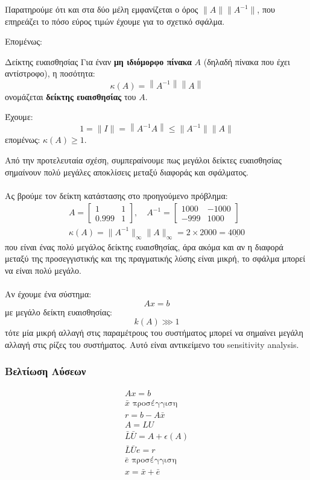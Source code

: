 \documentclass[11pt,a4paper,notitlepage,fleqn,final]{article}
\begin{document}
Παρατηρούμε ότι και στα δύο μέλη εμφανίζεται ο όρος
\( \lVert A\rVert\lVert A^{-1}\rVert \), που επηρεάζει το πόσο
εύρος τιμών έχουμε για το σχετικό σφάλμα.

Επομένως:

\begin{defn}{Δείκτης ευαισθησίας}{}
	Για έναν \textbf{μη ιδιόμορφο πίνακα} \( A \) (δηλαδή πίνακα
	που έχει αντίστροφο), η ποσότητα:
	\[
	\kappa(A) = \left\lVert A^{-1} \right\rVert
	\left\lVert A \right\rVert
	\]
	ονομάζεται \textbf{δείκτης ευαισθησίας} του \( A \).
\end{defn}

Έχουμε:
\[
1 = \lVert I \rVert = \left\lVert A^{-1} A \right\rVert
\leq \lVert A^{-1} \rVert \lVert A\rVert
\]
επομένως: \( \kappa(A) \geq 1 \).

Από την προτελευταία σχέση, συμπεραίνουμε πως μεγάλοι δείκτες
ευαισθησίας σημαίνουν πολύ μεγάλες αποκλίσεις μεταξύ διαφοράς
και σφάλματος.

\paragraph{}
Ας βρούμε τον δείκτη κατάστασης στο προηγούμενο πρόβλημα:
\begin{gather*}
	A = \left[\begin{matrix}
	1 & 1 \\ 0.999 & 1
	\end{matrix}\right], \quad A^{-1}=\left[\begin{matrix}
	1000 & -1000 \\ -999 & 1000
	\end{matrix}\right] \\
	\kappa (A) = \lVert A^{-1} \rVert_{\infty}\lVert A\rVert_{\infty}
	= 2 \times 2000 = \underline{4000}
\end{gather*}
που είναι ένας πολύ μεγάλος δείκτης ευαισθησίας, άρα ακόμα και αν η
διαφορά μεταξύ της προσεγγιστικής και της πραγματικής λύσης είναι μικρή,
το σφάλμα μπορεί να είναι πολύ μεγάλο.

\paragraph{}
Αν έχουμε ένα σύστημα:
\[
Ax = b
\]
με μεγάλο δείκτη ευαισθησίας:
\[
k(A) \ggg 1
\]
τότε μία μικρή αλλαγή στις παραμέτρους του συστήματος μπορεί να
σημαίνει μεγάλη αλλαγή στις ρίζες του συστήματος. Αυτό είναι αντικείμενο
του sensitivity analysis.

\subsubsection{Βελτίωση Λύσεων}
\begin{gather*}
	Ax = b \\
	\bar x \text{ προσέγγιση}\\
	r = b- A\bar x\\
	A=LU\\
	\bar L\bar U = A +\epsilon(A)\\
	\bar L \bar U e = r\\
	\bar e \text{ προσέγγιση} \\
	x = \bar x + \bar e
\end{gather*}
\end{document}
